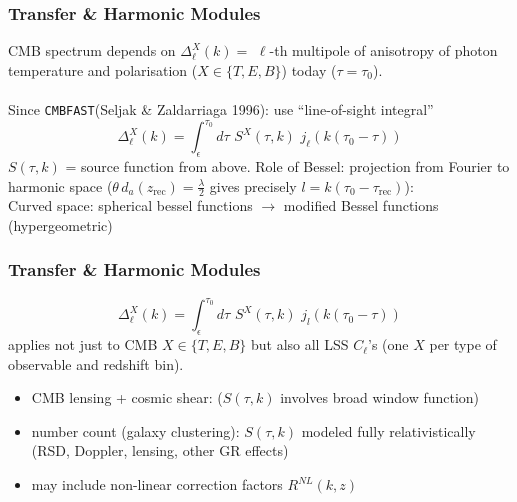 \begin{frame}[fragile]
\frametitle{Transfer \& Harmonic Modules}

CMB spectrum depends on $\Delta^X_\ell(k)=$ $\ell$-th multipole of anisotropy of photon temperature and polarisation ($X\in\{T,E,B\}$) today ($\tau=\tau_0$).
\\
\mbox{}\\
Since {\Red \tt CMBFAST}(Seljak \& Zaldarriaga 1996): use ``line-of-sight integral''
$$
\Delta^X_\ell(k)= \int_\epsilon^{\tau_0} d \tau \,\, S^X\!(\tau,k) \,\, j_\ell(k(\tau_0-\tau))
$$
$S(\tau,k)$ = source function from above.
Role of Bessel: projection from Fourier to harmonic space ($\theta \, d_a(z_\mathrm{rec}) = \frac{\lambda}{2}$ gives precisely $l=k(\tau_0-\tau_\mathrm{rec})$):\\
Curved space: spherical bessel functions $\rightarrow$ modified Bessel functions (hypergeometric)
\end{frame}

\begin{frame}[fragile]
\frametitle{Transfer \& Harmonic Modules}
$$
\Delta^X_\ell(k)= \int_\epsilon^{\tau_0} d \tau \,\, S^X\!(\tau,k) \,\, j_l(k(\tau_0-\tau))
$$
applies not just to CMB $X\in\{T,E,B\}$ but also all LSS $C_\ell$'s (one $X$ per type of observable and redshift bin).
\begin{itemize}
\item CMB lensing + cosmic shear: ($S(\tau,k)$ involves broad window function)
\item number count (galaxy clustering): $S(\tau,k)$ modeled fully relativistically (RSD, Doppler, lensing, other GR effects) 
\item may include non-linear correction factors $R^{NL}(k,z)$
\end{itemize}

\end{frame}  






